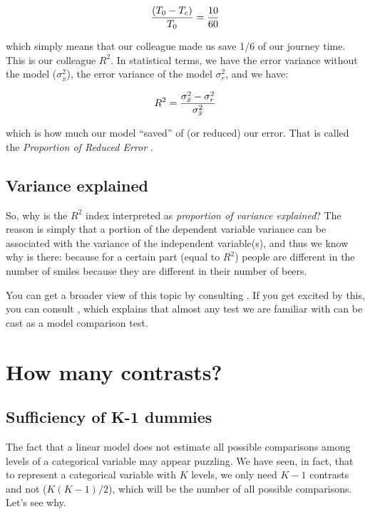 \documentclass[
]{book}
\begin{document}
\[ {(T_0-T_c) \over T_0}={10 \over60}\]

which simply means that our colleague made us save 1/6 of our journey time. This is our colleague \(R^2\). In statistical terms, we have the error variance without the model (\(\sigma_{\bar{x}}^2\)), the error variance of the model \(\sigma_{r}^2\), and we have:

\[ R^2={\sigma^2_{\bar{x}}-\sigma^2_r \over \sigma^2_{\bar{x}}}\]

which is how much our model ``saved'' of (or reduced) our error. That is called the \emph{Proportion of Reduced Error} \citep{judd2017data}.

\hypertarget{variance-explained}{%
\section{Variance explained}\label{variance-explained}}

So, why is the \(R^2\) index interpreted as \emph{proportion of variance explained}? The reason is simply that a portion of the dependent variable variance can be associated with the variance of the independent variable(s), and thus we know why is there: because for a certain part (equal to \(R^2\)) people are different in the number of smiles because they are different in their number of beers.

You can get a broader view of this topic by consulting \citet{judd2017data}. If you get excited by this, you can consult \citet{searle2016linear}, which explains that almost any test we are familiar with can be cast as a model comparison test.

\hypertarget{a1dummies}{%
\chapter{How many contrasts?}\label{a1dummies}}

\hypertarget{sufficiency-of-k-1-dummies}{%
\section{Sufficiency of K-1 dummies}\label{sufficiency-of-k-1-dummies}}

The fact that a linear model does not estimate all possible comparisons among levels of a categorical variable may appear puzzling. We have seen, in fact, that to represent a categorical variable with \(K\) levels, we only need \(K-1\) contrasts and not (\(K(K-1)/2\)), which will be the number of all possible comparisons. Let's see why.
\end{document}
